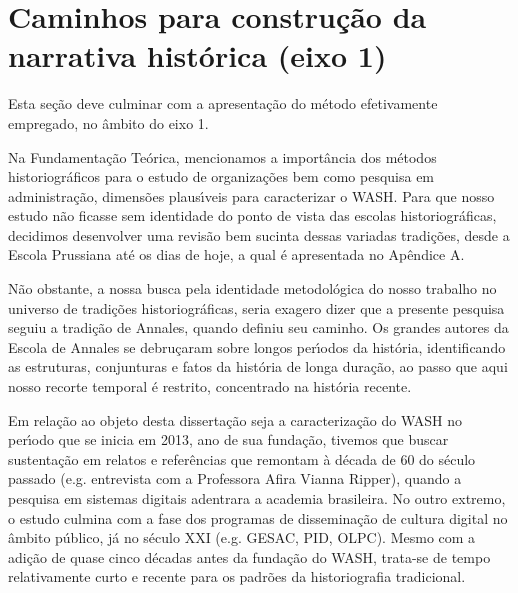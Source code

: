 \documentclass[
12pt,		%
openright,	%
twoside,  %
a4paper,			%
chapter=TITLE,		%
english,			%
french,				%
spanish,			%
brazil				%
]{USPSC-classe/USPSC}
\begin{document}
\section[Caminhos para constru\c{c}\~ao da narrativa hist\'orica (eixo 1)]{Caminhos para constru\c{c}\~ao da narrativa hist\'orica (eixo 1)}\label{Caminhos para constru\c{c}\~ao da narrativa hist\'orica (eixo 1)}
Esta se\c{c}\~ao deve culminar com a apresenta\c{c}\~ao do m\'etodo efetivamente empregado, no \^ambito do eixo 1.









Na Fundamenta\c{c}\~ao Te\'orica, mencionamos a import\^ancia dos m\'etodos historiogr\'aficos para o estudo de organiza\c{c}\~oes bem como pesquisa em administra\c{c}\~ao, dimens\~oes plaus\'{\i}veis para caracterizar o WASH. Para que nosso estudo n\~ao ficasse sem identidade do ponto de vista das escolas historiogr\'aficas, decidimos desenvolver uma revis\~ao bem sucinta dessas variadas tradi\c{c}\~oes, desde a Escola Prussiana at\'e os dias de hoje, a qual \'e apresentada no Ap\^endice A.









N\~ao obstante, a nossa busca pela identidade metodol\'ogica do nosso trabalho no universo de tradi\c{c}\~oes historiogr\'aficas, seria exagero dizer que a presente pesquisa seguiu a tradi\c{c}\~ao de Annales, quando definiu seu caminho. Os grandes autores da Escola de Annales se debru\c{c}aram sobre longos per\'{\i}odos da hist\'oria, identificando as estruturas, conjunturas e fatos da \textquotedbl hist\'oria de longa dura\c{c}\~ao\textquotedbl , ao passo que aqui nosso recorte temporal \'e restrito, concentrado na hist\'oria recente.









Em rela\c{c}\~ao ao objeto desta disserta\c{c}\~ao seja a caracteriza\c{c}\~ao do WASH no per\'{\i}odo que se inicia em 2013, ano de sua funda\c{c}\~ao, tivemos que buscar sustenta\c{c}\~ao em relatos e refer\^encias que remontam \`a d\'ecada de 60 do s\'eculo passado (e.g. entrevista com a Professora Afira Vianna Ripper), quando a pesquisa em sistemas digitais adentrara a academia brasileira. No outro extremo, o estudo culmina com a fase dos programas de dissemina\c{c}\~ao de cultura digital no \^ambito p\'ublico, j\'a no s\'eculo XXI (e.g. GESAC, PID, OLPC).  Mesmo com a adi\c{c}\~ao de quase cinco d\'ecadas antes da funda\c{c}\~ao do WASH, trata-se de tempo relativamente curto e recente para os padr\~oes da historiografia tradicional.
\end{document}
